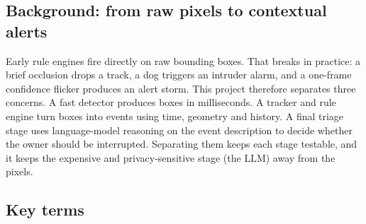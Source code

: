 \documentclass[11pt]{article}
\begin{document}
\subsection{Background: from raw pixels to contextual alerts}

Early rule engines fire directly on raw bounding boxes. That breaks in practice: a brief occlusion drops a track, a dog triggers an intruder alarm, and a one-frame confidence flicker produces an alert storm. This project therefore separates three concerns. A fast detector produces boxes in milliseconds. A tracker and rule engine turn boxes into events using time, geometry and history. A final triage stage uses language-model reasoning on the event description to decide whether the owner should be interrupted. Separating them keeps each stage testable, and it keeps the expensive and privacy-sensitive stage (the LLM) away from the pixels.

\subsection{Key terms}
\end{document}
